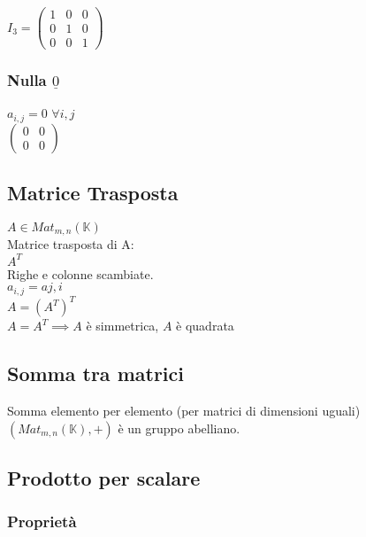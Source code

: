 \documentclass[a4paper, twoside, italian, 11pt]{book}
\newcommand{\K}{\mathbb{K}}
\begin{document}
\noindent
$I_3 = \begin{pmatrix}
1 & 0 & 0 \\
0 & 1 & 0 \\
0 & 0 & 1
\end{pmatrix}$


\subsubsection{Nulla $\underline{0}$}

$a_{i,j} = 0$ $\forall i, j$ \\

\noindent
$\begin{pmatrix}
0 & 0 \\
0 & 0
\end{pmatrix}$


\subsection{Matrice Trasposta}

$A \in Mat_{m,n}(\K)$ \\

\noindent
Matrice trasposta di A: \\
$A^T$ \\

\noindent
Righe e colonne scambiate. \\
$a_{i,j} = a{j,i}$ \\

\noindent
$A = (A^T)^T$ \\

\noindent
$A = A^T \implies A$ è simmetrica, $A$ è quadrata


\subsection{Somma tra matrici}

Somma elemento per elemento (per matrici di dimensioni uguali) \\

\noindent
$(Mat_{m,n}(\K), +)$ è un gruppo abelliano.


\subsection{Prodotto per scalare}


\subsubsection{Proprietà}
\end{document}

